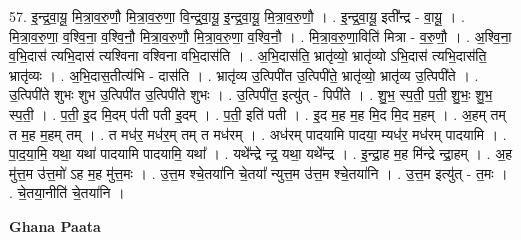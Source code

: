 \documentclass[17pt]{extarticle}
\begin{document}
57. इ॒न्द्र॒वा॒यू॒ मि॒त्रा॒व॒रु॒णौ॒ मि॒त्रा॒व॒रु॒णा॒ वि॒न्द्र॒वा॒॒यू॒ इ॒न्द्र॒वा॒यू॒ मि॒त्रा॒व॒रु॒णौ॒  । . इ॒न्द्र॒वा॒यू॒ इती᳚न्द्र - वा॒यू॒ । . मि॒त्रा॒व॒रु॒णा॒ व॒श्वि॒ना॒ व॒श्वि॒नौ॒ मि॒त्रा॒व॒रु॒णौ॒ मि॒त्रा॒व॒रु॒णा॒ व॒श्वि॒नौ॒ । . मि॒त्रा॒व॒रु॒णा॒विति॑ मित्रा - व॒रु॒णौ॒ । . अ॒श्वि॒ना॒ व॒भि॒दास॑ त्यभि॒दास॑ त्यश्विना वश्विना वभि॒दास॑ति । . अ॒भि॒दास॑ति॒ भ्रातृ॑व्यो॒ भ्रातृ॑व्यो ऽभि॒दास॑ त्यभि॒दास॑ति॒ भ्रातृ॑व्यः । . अ॒भि॒दास॒तीत्य॑भि - दास॑ति । . भ्रातृ॑व्य उ॒त्पिपी॑त उ॒त्पिपी॑ते॒ भ्रातृ॑व्यो॒ भ्रातृ॑व्य उ॒त्पिपी॑ते । . उ॒त्पिपी॑ते शुभः शुभ उ॒त्पिपी॑त उ॒त्पिपी॑ते शुभः । . उ॒त्पिपी॑त॒ इत्यु॑त् - पिपी॑ते । . शु॒भ॒ स्प॒ती॒ प॒ती॒ शु॒भः॒ शु॒भ॒ स्प॒ती॒ । . प॒ती॒ इ॒द मि॒दम् प॑ती पती इ॒दम् । . प॒ती॒ इति॑ पती । . इ॒द म॒ह म॒ह मि॒द मि॒द म॒हम् । . अ॒हम् तम् त म॒ह म॒हम् तम् । . त मध॑र॒ मध॑र॒म् तम् त मध॑रम् । . अध॑रम् पादयामि पादया॒ म्यध॑र॒ मध॑रम् पादयामि । . पा॒द॒या॒मि॒ यथा॒ यथा॑ पादयामि पादयामि॒ यथा᳚ । . यथे᳚न्द्रे न्द्र॒ यथा॒ यथे᳚न्द्र । . इ॒न्द्रा॒ह म॒ह मि॑न्द्रे न्द्रा॒हम् । . अ॒ह मु॑त्त॒म उ॑त्त॒मो॑ ऽह म॒ह मु॑त्त॒मः । . उ॒त्त॒म श्चे॒तया॑नि चे॒तया᳚ न्युत्त॒म उ॑त्त॒म श्चे॒तया॑नि । . उ॒त्त॒म इत्यु॑त् - त॒मः । . चे॒तया॒नीति॑ चे॒तया॑नि । \newline

\textbf{Ghana Paata } \newline
\end{document}
